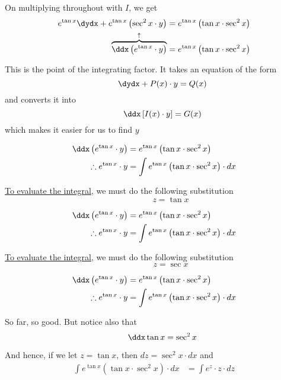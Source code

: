 \documentclass[14pt,fleqn]{extarticle}
\newcommand\intgf{ e^{\tan x}}
\newcommand\expa{\tan x\cdot\sec^2 x}
\begin{document}
\begin{problem}
\begin{step}
On multiplying throughout with $I$, we get 
\smallmath
\begin{align}
\intgf \dydx + \intgf \left(\sec^2x \cdot y \right) &= \intgf \left(\expa \right) \\
\overbrace{\ddx \left(\intgf\cdot y \right)}^{\uparrow} &= \intgf \left(\expa \right)
\end{align}

This is the point of the integrating factor. It takes an equation of the form 
\[ \qquad \dydx + P(x)\cdot y = Q(x) \]
and converts it into 
\[ \qquad \ddx \left[I(x)\cdot y \right] = G(x) \]
which makes it easier for us to find $y$ 
\end{step}

\begin{step}
  \begin{options} 
     \correct 
       
       \begin{align}
	\ddx \left(\intgf \cdot y \right) &= \intgf \left(\expa \right) \\
	\therefore \intgf\cdot y &= \int \intgf \left(\expa \right)\cdot dx 
\end{align}

\underline{To evaluate the integral}, we must do the following substitution 
\[ \qquad \qquad z = \tan x \]

     \incorrect
     
     \begin{align}
	\ddx \left(\intgf \cdot y \right) &= \intgf \left(\expa \right) \\
	\therefore \intgf\cdot y &= \int \intgf \left(\expa \right)\cdot dx 
\end{align}

\underline{To evaluate the integral}, we must do the following substitution 
\[ \qquad \qquad z = \sec x \]
        
    \end{options} 
     \reason 
     
     \begin{align}
	\ddx \left(\intgf \cdot y \right) &= \intgf \left(\expa \right) \\
	\therefore \intgf\cdot y &= \int \intgf \left(\expa \right)\cdot dx 
\end{align}

So far, so good. But notice also that 
\[ \qquad \ddx \tan x = \sec^2 x\]

And hence, if we let $z = \tan x$, then $dz = \sec^2x\cdot dx$ and 
\begin{align}
\int \intgf \left(\expa \right)\cdot dx &= \int e^z\cdot z \cdot dz 
\end{align}
       

\end{step}
\end{problem}
\end{document}

